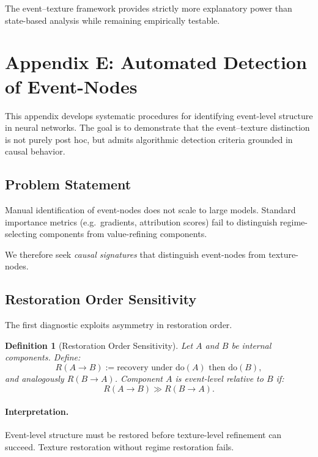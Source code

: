 \documentclass[11pt]{article}
\newtheorem{definition}{Definition}
\theoremstyle{remark}
\newcommand{\Do}{\mathrm{do}}
\begin{document}
The event–texture framework provides strictly more explanatory power
than state-based analysis while remaining empirically testable.

\section{Appendix E: Automated Detection of Event-Nodes}

This appendix develops systematic procedures for identifying
event-level structure in neural networks. The goal is to demonstrate
that the event–texture distinction is not purely post hoc, but admits
algorithmic detection criteria grounded in causal behavior.

\subsection{Problem Statement}

Manual identification of event-nodes does not scale to large models.
Standard importance metrics (e.g.\ gradients, attribution scores)
fail to distinguish regime-selecting components from value-refining
components.

We therefore seek \emph{causal signatures} that distinguish event-nodes
from texture-nodes.

\subsection{Restoration Order Sensitivity}

The first diagnostic exploits asymmetry in restoration order.

\begin{definition}[Restoration Order Sensitivity]
Let $A$ and $B$ be internal components. Define:
\[
R(A \rightarrow B) := \text{recovery under } \Do(A) \text{ then } \Do(B),
\]
and analogously $R(B \rightarrow A)$. Component $A$ is event-level
relative to $B$ if:
\[
R(A \rightarrow B) \gg R(B \rightarrow A).
\]
\end{definition}

\paragraph{Interpretation.}
Event-level structure must be restored before texture-level refinement
can succeed. Texture restoration without regime restoration fails.
\end{document}
